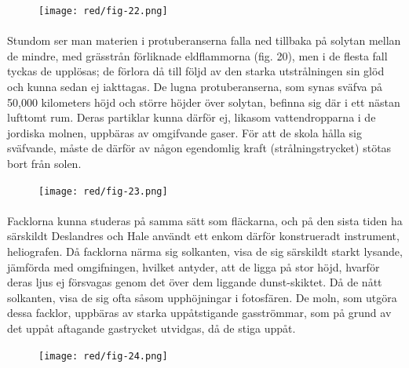 \documentclass[a4paper, 12pt, oneside, swedish]{article}
\begin{document}
\begin{figure}[H]
\centering
\texttt{[image: red/fig-22.png]}
\caption{}
\end{figure}
\paragraph{}
Stundom ser man materien i protuberanserna falla ned tillbaka på solytan mellan de mindre, med grässtrån förliknade eldflammorna (fig. 20), men i de flesta fall tyckas de upplösas; de förlora då till följd av den starka utstrålningen sin glöd och kunna sedan ej iakttagas. De lugna protuberanserna, som synas sväfva på 50,000 kilometers höjd och större höjder över solytan, befinna sig där i ett nästan lufttomt rum. Deras partiklar kunna därför ej, likasom vattendropparna i de jordiska molnen, uppbäras av omgifvande gaser. För att de skola hålla sig sväfvande, måste de därför av någon egendomlig kraft (strålningstrycket) stötas bort från solen.

\begin{figure}[H]
\centering
\texttt{[image: red/fig-23.png]}
\caption{}
\end{figure}
\paragraph{}
Facklorna kunna studeras på samma sätt som fläckarna, och på den sista tiden ha särskildt Deslandres och Hale användt ett enkom därför konstrueradt instrument, heliografen. Då facklorna närma sig solkanten, visa de sig särskildt starkt lysande, jämförda med omgifningen, hvilket antyder, att de ligga på stor höjd, hvarför deras ljus ej försvagas genom det över dem liggande dunst-skiktet. Då de nått solkanten, visa de sig ofta såsom upphöjningar i fotosfären. De moln, som utgöra dessa facklor, uppbäras av starka uppåtstigande gasströmmar, som på grund av det uppåt aftagande gastrycket utvidgas, då de stiga uppåt.

\begin{figure}[H]
\centering
\texttt{[image: red/fig-24.png]}
\caption{}
\end{figure}
\end{document}
